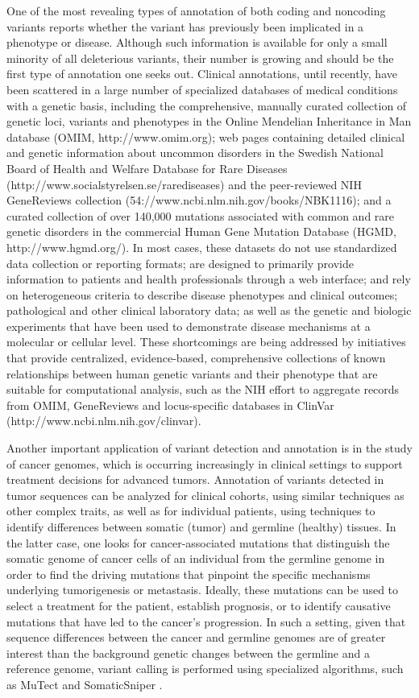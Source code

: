 One of the most revealing types of annotation of both coding and noncoding variants reports whether the variant has previously been implicated in a phenotype or disease. Although such information is available for only a small minority of all deleterious variants, their number is growing and should be the first type of annotation one seeks out. Clinical annotations, until recently, have been scattered in a large number of specialized databases of medical conditions with a genetic basis, including the comprehensive, manually curated collection of genetic loci, variants and phenotypes in the Online Mendelian Inheritance in Man database (OMIM, http://www.omim.org); web pages containing detailed clinical and genetic information about uncommon disorders in the Swedish National Board of Health and Welfare Database for Rare Diseases (http://www.socialstyrelsen.se/rarediseases) and the peer-reviewed NIH GeneReviews collection (54://www.ncbi.nlm.nih.gov/books/NBK1116); and a curated collection of over 140,000 mutations associated with common and rare genetic disorders in the commercial Human Gene Mutation Database (HGMD, http://www.hgmd.org/). In most cases, these datasets do not use standardized data collection or reporting formats; are designed to primarily provide information to patients and health professionals through a web interface; and rely on heterogeneous criteria to describe disease phenotypes and clinical outcomes; pathological and other clinical laboratory data; as well as the genetic and biologic experiments that have been used to demonstrate disease mechanisms at a molecular or cellular level. These shortcomings are being addressed by initiatives that provide centralized, evidence-based, comprehensive collections of known relationships between human genetic variants and their phenotype that are suitable for computational analysis, such as the NIH effort to aggregate records from OMIM, GeneReviews and locus-specific databases in ClinVar (http://www.ncbi.nlm.nih.gov/clinvar). 

Another important application of variant detection and annotation is in the study of cancer genomes, which is occurring increasingly in clinical settings to support treatment decisions for advanced tumors. Annotation of variants detected in tumor sequences can be analyzed for clinical cohorts, using similar techniques as other complex traits, as well as for individual patients, using techniques to identify differences between somatic (tumor) and germline (healthy) tissues. In the latter case, one looks for cancer-associated mutations that distinguish the somatic genome of cancer cells of an individual from the germline genome in order to find the driving mutations that pinpoint the specific mechanisms underlying tumorigenesis or metastasis. Ideally, these mutations can be used to select a treatment for the patient, establish prognosis, or to identify causative mutations that have led to the cancer’s progression. In such a setting, given that sequence differences between the cancer and germline genomes are of greater interest than the background genetic changes between the germline and a reference genome, variant calling is performed using specialized algorithms, such as MuTect  \cite{REF63} and SomaticSniper  \cite{REF64}.

